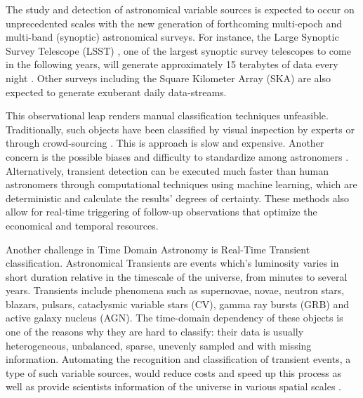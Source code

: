 \documentclass[a4paper,fleqn,usenatbib]{mnras}
\begin{document}
The study and detection of astronomical variable sources is expected
to occur on unprecedented scales with the new generation of
forthcoming multi-epoch and multi-band (synoptic) astronomical
surveys. 
For instance, the Large Synoptic Survey Telescope (LSST)
\citep{0805.2366}, one of the largest synoptic survey telescopes to
come in the following years, will generate approximately 15 terabytes
of data every night \citep{1512.07914}.  
Other surveys including the Square Kilometer Array (SKA) are also expected
to generate exuberant daily data-streams. 

This observational leap renders manual classification techniques
unfeasible.   
Traditionally, such objects have been classified by visual inspection
by experts or through crowd-sourcing
\citep{1011.2199,0708.2750}. 
This is approach is slow and expensive.
Another concern is the possible biases and difficulty to standardize among 
astronomers \citep{1104.3142}. 
Alternatively, transient detection can be executed much faster than
human astronomers through computational techniques using machine
learning, 
which are deterministic and calculate the results' degrees of
certainty. 
These methods also allow for real-time triggering of follow-up
observations that optimize the economical and temporal resources. 
 

Another challenge in  Time Domain Astronomy is Real-Time Transient classification. 
Astronomical Transients are events which's luminosity varies in short duration
relative in the timescale of the universe, from minutes to several
years. 
Transients include phenomena such as supernovae, novae, neutron
stars, blazars, pulsars, cataclysmic variable stars (CV), gamma ray
bursts (GRB) and active galaxy nucleus (AGN). 
The time-domain dependency of these objects is one of the reasons why
they are hard to classify: their data is usually heterogeneous,
unbalanced, sparse, unevenly sampled and with missing information. 
Automating the recognition and classification of transient events, a type of such
variable sources, would reduce costs and speed up this process as well
as provide scientists information of the universe in various spatial
scales \citep{2011arXiv1110.4655D}.  
\end{document}
